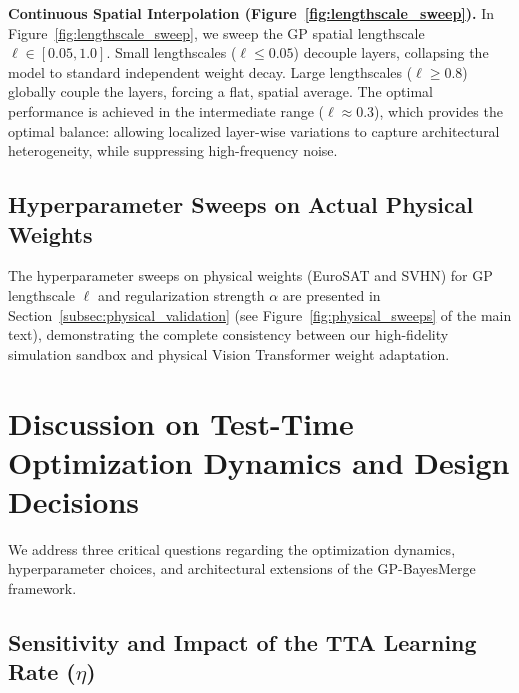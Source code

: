 \documentclass{article}
\theoremstyle{plain}
\theoremstyle{definition}
\theoremstyle{remark}
\begin{document}
\textbf{Continuous Spatial Interpolation (Figure~\ref{fig:lengthscale_sweep}).} In Figure~\ref{fig:lengthscale_sweep}, we sweep the GP spatial lengthscale $\ell \in [0.05, 1.0]$. Small lengthscales ($\ell \le 0.05$) decouple layers, collapsing the model to standard independent weight decay. Large lengthscales ($\ell \ge 0.8$) globally couple the layers, forcing a flat, spatial average. The optimal performance is achieved in the intermediate range ($\ell \approx 0.3$), which provides the optimal balance: allowing localized layer-wise variations to capture architectural heterogeneity, while suppressing high-frequency noise.

\subsection{Hyperparameter Sweeps on Actual Physical Weights}
The hyperparameter sweeps on physical weights (EuroSAT and SVHN) for GP lengthscale $\ell$ and regularization strength $\alpha$ are presented in Section~\ref{subsec:physical_validation} (see Figure~\ref{fig:physical_sweeps} of the main text), demonstrating the complete consistency between our high-fidelity simulation sandbox and physical Vision Transformer weight adaptation.

\section{Discussion on Test-Time Optimization Dynamics and Design Decisions}
\label{sec:appendix_dynamics}

We address three critical questions regarding the optimization dynamics, hyperparameter choices, and architectural extensions of the GP-BayesMerge framework.

\subsection{Sensitivity and Impact of the TTA Learning Rate ($\eta$)}
\end{document}
